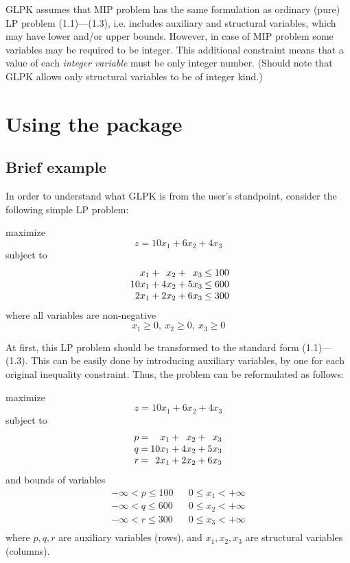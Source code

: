 GLPK assumes that MIP problem has the same formulation as ordinary
(pure) LP problem (1.1)---(1.3), i.e. includes auxiliary and structural
variables, which may have lower and/or upper bounds. However, in case
of MIP problem some variables may be required to be integer. This
additional constraint means that a value of each {\it integer variable}
must be only integer number. (Should note that GLPK allows only
structural variables to be of integer kind.)

\section{Using the package}

\subsection{Brief example}

In order to understand what GLPK is from the user's standpoint,
consider the following simple LP problem:

\noindent
\hspace{.5in} maximize
$$z = 10 x_1 + 6 x_2 + 4 x_3$$
\hspace{.5in} subject to
$$
\begin{array}{r@{\:}c@{\:}r@{\:}c@{\:}r@{\:}c@{\:}r}
x_1 &+&x_2 &+&x_3 &\leq 100 \\
10 x_1 &+& 4 x_2 & +&5 x_3 & \leq 600 \\
2 x_1 &+& 2 x_2 & +& 6 x_3 & \leq 300 \\
\end{array}
$$
\hspace{.5in} where all variables are non-negative
$$x_1 \geq 0, \ x_2 \geq 0, \ x_3 \geq 0$$

At first, this LP problem should be transformed to the standard form
(1.1)---(1.3). This can be easily done by introducing auxiliary
variables, by one for each original inequality constraint. Thus, the
problem can be reformulated as follows:

\noindent
\hspace{.5in} maximize
$$z = 10 x_1 + 6 x_2 + 4 x_3$$
\hspace{.5in} subject to
$$
\begin{array}{r@{\:}c@{\:}r@{\:}c@{\:}r@{\:}c@{\:}r}
p& = &x_1 &+&x_2 &+&x_3 \\
q& = &10 x_1 &+& 4 x_2 &+& 5 x_3 \\
r& = &2  x_1 &+& 2 x_2 &+& 6 x_3 \\
\end{array}
$$
\hspace{.5in} and bounds of variables
$$
\begin{array}{ccc}
\nonumber -\infty < p \leq 100 && 0 \leq x_1 < +\infty \\
\nonumber -\infty < q \leq 600 && 0 \leq x_2 < +\infty \\
\nonumber -\infty < r \leq 300 && 0 \leq x_3 < +\infty \\
\end{array}
$$
where $p, q, r$ are auxiliary variables (rows), and $x_1, x_2, x_3$ are
structural variables (columns).

